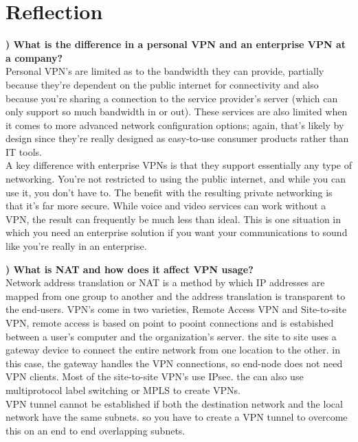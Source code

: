 \documentclass{report}
\title{\classinfo}
\author{\semester}
\date{\today}
\newcommand{\mysection}[1]{\section*{#1}}
\newcommand{\mysubsection}[2]{\textbf{\romannumeral #1) #2}}
\begin{document}
\maketitle

\mysection{\textbf{Reflection}}

\mysubsection{1}{What is the difference in a personal VPN and an enterprise VPN at a company?  }
\\Personal VPN's are limited as to the bandwidth they can provide, partially
because they're dependent on the public internet for connectivity and also 
because you're sharing a connection to the service provider's server (which 
can only support so much bandwidth in or out). These services are also limited 
when it comes to more advanced network configuration options; again, that's 
likely by design since they're really designed as easy-to-use consumer 
products rather than IT tools.
\\A key difference with enterprise VPNs is that they support essentially any
type of networking. You're not restricted to using the public internet, and
while you can use it, you don't have to. The benefit with the resulting private
networking is that it's far more secure. While voice and video services can 
work without a VPN, the result can frequently be much less than ideal. This is 
one situation in which you need an enterprise solution if you want your 
communications to sound like you're really in an enterprise.

\noindent\mysubsection{2}{What is NAT and how does it affect VPN usage?}
\\Network address translation or NAT is a method by which IP addresses are
mapped from one group to another and the address translation is transparent to
the end-users. VPN's come in two varieties, Remote Access VPN and Site-to-site
VPN, remote access is based on point to pooint connections and is estabished
between a user's computer and the organization's server. the site to site uses
a gateway device to connect the entire network from one location to the other.
in this case, the gateway handles the VPN connections, so end-node does not
need VPN clients. Most of the site-to-site VPN's use IPsec. the can also use
multiprotocol label switching or MPLS to create VPNs.
\\ VPN tunnel cannot be established if both the destination network and the
local network have the same subnets. so you have to create a VPN tunnel to
overcome this on an end to end overlapping subnets.
\end{document}
